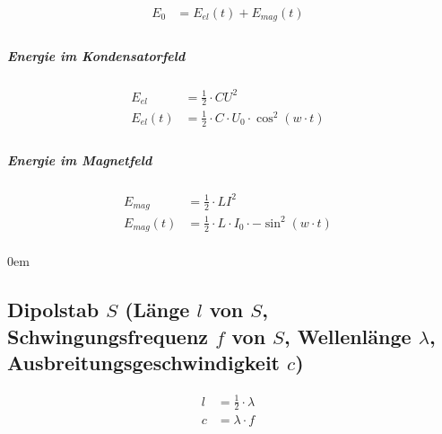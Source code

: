 \begin{align*}
  E_0 &= E_{el} \left(t\right) + E_{mag} \left(t\right) &\\
\end{align*}

\subparagraph{Energie im Kondensatorfeld}

\begin{align*}
  E_{el} &= \frac{1}{2} \cdot C U^2 &\\
  E_{el} \left(t\right) &= \frac{1}{2} \cdot C \cdot U_0 \cdot \cos^2 \left(w \cdot t\right) &\\
\end{align*}

\subparagraph{Energie im Magnetfeld}

\begin{align*}
  E_{mag} &= \frac{1}{2} \cdot L I^2 &\\
  E_{mag} \left(t\right) &= \frac{1}{2} \cdot L \cdot I_0 \cdot - \sin^2 \left(w \cdot t\right) &\\
\end{align*}

\leftskip0em

\subsection{Dipolstab $S$ (Länge $l$ von $S$, Schwingungsfrequenz $f$ von $S$,
Wellenlänge $\lambda$, Ausbreitungsgeschwindigkeit $c$)}

\begin{align*}
  l &= \frac{1}{2} \cdot \lambda &\\
  c &= \lambda \cdot f
\end{align*}
